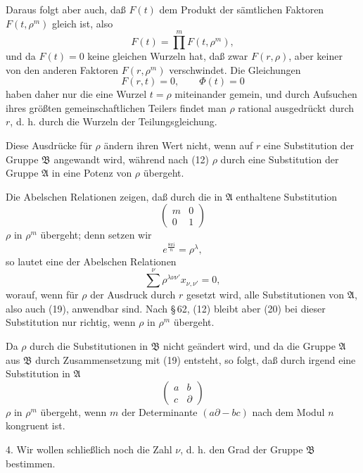 \documentclass[11pt]{article}
\providecommand{\ii}{\mathrm{i}}
\begin{document}
Daraus folgt aber auch, daß $F(t)$ dem Produkt der sämtlichen Faktoren $F(t,\rho^m)$
gleich ist, also
\begin{equation}
 F(t)=\prod^m F(t,\rho^m),
\tag{17}
\end{equation}
und da $F(t)=0$ keine gleichen Wurzeln hat, daß zwar $F(r,\rho)$, aber keiner von den
anderen Faktoren $F(r,\rho^m)$ verschwindet. Die Gleichungen
\begin{equation}
 F(r,t)=0,
 \qquad \Phi(t)=0
\tag{18}
\end{equation}
haben daher nur die eine Wurzel $t=\rho$ miteinander gemein, und durch Aufsuchen ihres
größten gemeinschaftlichen Teilers findet man $\rho$ rational ausgedrückt durch $r$, d. h.
durch die Wurzeln der Teilungsgleichung.

Diese Ausdrücke für $\rho$ ändern ihren Wert nicht, wenn auf $r$ eine Substitution der
Gruppe $\mathfrak B$ angewandt wird, während nach (12) $\rho$ durch eine Substitution der
Gruppe $\mathfrak A$ in eine Potenz von $\rho$ übergeht.

Die Abelschen Relationen zeigen, daß durch die in $\mathfrak A$ enthaltene Substitution
\begin{equation}
 \begin{pmatrix}m&0\\0&1\end{pmatrix}
\tag{19}
\end{equation}
$\rho$ in $\rho^m$ übergeht; denn setzen wir
\[
 e^{\frac{8\pi \ii}{n}}=\rho^\lambda,
\]
so lautet eine der Abelschen Relationen
\begin{equation}
 \sum^\nu \rho^{\lambda\nu\nu'}x_{\nu,\nu'}=0,
\tag{20}
\end{equation}
worauf, wenn für $\rho$ der Ausdruck durch $r$ gesetzt wird, alle Substitutionen von
$\mathfrak A$, also auch (19), anwendbar sind. Nach \S\,62, (12) bleibt aber (20) bei dieser
Substitution nur richtig, wenn $\rho$ in $\rho^m$ übergeht.

Da $\rho$ durch die Substitutionen in $\mathfrak B$ nicht geändert wird, und da die Gruppe
$\mathfrak A$ aus $\mathfrak B$ durch Zusammensetzung mit (19) entsteht, so folgt, daß durch
irgend eine Substitution in $\mathfrak A$
\[
 \begin{pmatrix}a&b\\c&\partial\end{pmatrix}
\]
$\rho$ in $\rho^m$ übergeht, wenn $m$ der Determinante $(a\partial-bc)$ nach dem Modul $n$
kongruent ist.

4. Wir wollen schließlich noch die Zahl $\nu$, d. h. den Grad der Gruppe $\mathfrak B$
bestimmen.
\end{document}
